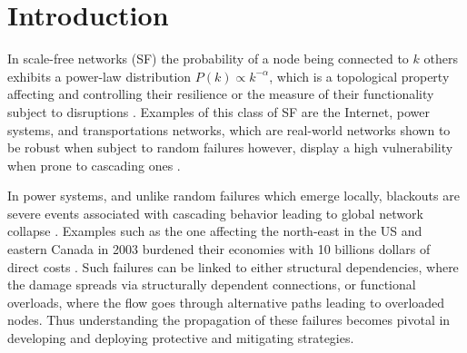 \section{Introduction}
\label{introduction}



In scale-free networks (SF) the probability of a node being connected to $k$ others exhibits a power-law distribution $P(k) \propto k^{-\alpha}$, which is a topological property affecting and controlling their resilience or the measure of their functionality subject to disruptions \cite{Newman:2003da,Gao:2015fg,Bashan:2013cja,Gao:2015fga,2000Natur.406..378A}. Examples of this class of SF are the Internet, power systems, and transportations networks, which are real-world networks shown to be robust when subject to random failures however, display a high vulnerability when prone to cascading ones \cite{Bompard:2011cd,DuenasOsorio:2009ff,2016arXiv160904310M,Cohen:2001hf}. 

In power systems, and unlike random failures which emerge locally, blackouts are severe events  associated with cascading behavior leading to global network collapse \cite{RosasCasals:2007td,Bompard:2009ga,Brummitt:2013jj,Daqing:2014bp,Albert:2004bw,Wang:2011js,Sole:2008cv}.
Examples such as the one affecting the north-east in the US and eastern Canada in 2003 burdened their economies with 10 billions dollars of direct costs \cite{Daqing:2014bp}. Such failures can be linked to either structural dependencies, where the damage spreads via structurally dependent connections, or functional overloads, where the flow goes through alternative paths leading to overloaded nodes. Thus understanding the propagation of these failures becomes pivotal in developing and deploying protective and mitigating strategies. 

